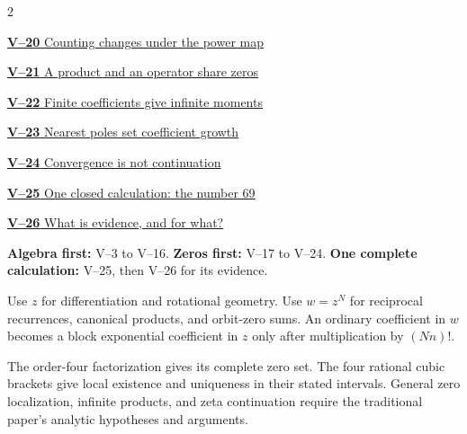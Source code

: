 \documentclass[11pt,a4paper]{article}
\newcommand{\head}[1]{\par\vspace{2pt}{\sffamily\bfseries\normalsize #1}\par\vspace{1pt}}
\begin{document}
\begin{multicols}{2}
{\small\noindent\hyperlink{vpage20}{\textbf{V--20} Counting changes under the power map}\par\smallskip}
{\small\noindent\hyperlink{vpage21}{\textbf{V--21} A product and an operator share zeros}\par\smallskip}
{\small\noindent\hyperlink{vpage22}{\textbf{V--22} Finite coefficients give infinite moments}\par\smallskip}
{\small\noindent\hyperlink{vpage23}{\textbf{V--23} Nearest poles set coefficient growth}\par\smallskip}
{\small\noindent\hyperlink{vpage24}{\textbf{V--24} Convergence is not continuation}\par\smallskip}
{\small\noindent\hyperlink{vpage25}{\textbf{V--25} One closed calculation: the number 69}\par\smallskip}
{\small\noindent\hyperlink{vpage26}{\textbf{V--26} What is evidence, and for what?}\par\smallskip}
\end{multicols}
\medskip
\head{Three reading routes}
\textbf{Algebra first:} V--3 to V--16.
\textbf{Zeros first:} V--17 to V--24.
\textbf{One complete calculation:} V--25, then V--26 for its evidence.
\head{Keep the two variables distinct}
Use $z$ for differentiation and rotational geometry. Use $w=z^N$ for
reciprocal recurrences, canonical products, and orbit-zero sums. An ordinary
coefficient in $w$ becomes a block exponential coefficient in $z$ only after
multiplication by $(Nn)!$.
\head{Exact models and analytic conclusions}
The order-four factorization gives its complete zero set. The four rational
cubic brackets give local existence and uniqueness in their stated intervals.
General zero localization, infinite products, and zeta continuation require
the traditional paper's analytic hypotheses and arguments.
\clearpage
{}

\end{document}
